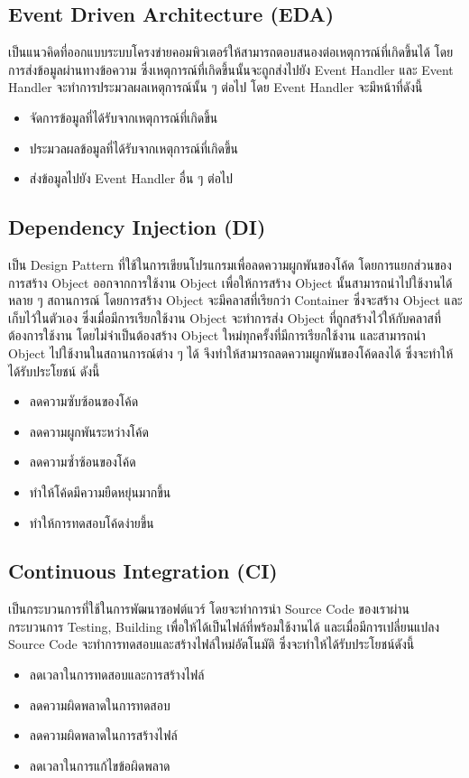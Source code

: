 \documentclass[12pt,oneside,openright,a4paper]{cpe-thai-project}
\begin{document}
  \subsection{Event Driven Architecture (EDA)}
    \hspace{1cm}เป็นแนวคิดที่ออกแบบระบบโครงข่ายคอมพิวเตอร์ให้สามารถตอบสนองต่อเหตุการณ์ที่เกิดขึ้นได้ โดยการส่งข้อมูลผ่านทางข้อความ ซึ่งเหตุการณ์ที่เกิดขึ้นนั้นจะถูกส่งไปยัง Event Handler
    และ Event Handler จะทำการประมวลผลเหตุการณ์นั้น ๆ ต่อไป \cite{eda} โดย Event Handler จะมีหน้าที่ดังนี้ 
    \begin{itemize}
      \item จัดการข้อมูลที่ได้รับจากเหตุการณ์ที่เกิดขึ้น
      \item ประมวลผลข้อมูลที่ได้รับจากเหตุการณ์ที่เกิดขึ้น
      \item ส่งข้อมูลไปยัง Event Handler อื่น ๆ ต่อไป
    \end{itemize}
  
  \subsection{Dependency Injection (DI)}
    \hspace{1cm}เป็น Design Pattern ที่ใช้ในการเขียนโปรแกรมเพื่อลดความผูกพันของโค้ด โดยการแยกส่วนของการสร้าง Object ออกจากการใช้งาน Object
    เพื่อให้การสร้าง Object นั้นสามารถนำไปใช้งานได้หลาย ๆ สถานการณ์ \cite{di} โดยการสร้าง Object จะมีคลาสที่เรียกว่า Container ซึ่งจะสร้าง Object และเก็บไว้ในตัวเอง
    ซึ่งเมื่อมีการเรียกใช้งาน Object จะทำการส่ง Object ที่ถูกสร้างไว้ให้กับคลาสที่ต้องการใช้งาน โดยไม่จำเป็นต้องสร้าง Object ใหม่ทุกครั้งที่มีการเรียกใช้งาน
    และสามารถนำ Object ไปใช้งานในสถานการณ์ต่าง ๆ ได้ จึงทำให้สามารถลดความผูกพันของโค้ดลงได้ ซึ่งจะทำให้ได้รับประโยชน์ ดังนี้
    \begin{itemize}
      \item ลดความซับซ้อนของโค้ด
      \item ลดความผูกพันระหว่างโค้ด
      \item ลดความซ้ำซ้อนของโค้ด
      \item ทำให้โค้ดมีความยืดหยุ่นมากขึ้น
      \item ทำให้การทดสอบโค้ดง่ายขึ้น
    \end{itemize}
  
  \subsection{Continuous Integration (CI)}
    \hspace{1cm}เป็นกระบวนการที่ใช้ในการพัฒนาซอฟต์แวร์ โดยจะทำการนำ Source Code ของเราผ่านกระบวนการ Testing, Building เพื่อให้ได้เป็นไฟล์ที่พร้อมใช้งานได้
    และเมื่อมีการเปลี่ยนแปลง Source Code จะทำการทดสอบและสร้างไฟล์ใหม่อัตโนมัติ \cite{ci_cd} ซึ่งจะทำให้ได้รับประโยชน์ดังนี้
    \begin{itemize}
      \item ลดเวลาในการทดสอบและการสร้างไฟล์
      \item ลดความผิดพลาดในการทดสอบ
      \item ลดความผิดพลาดในการสร้างไฟล์
      \item ลดเวลาในการแก้ไขข้อผิดพลาด
    \end{itemize}
\end{document}
